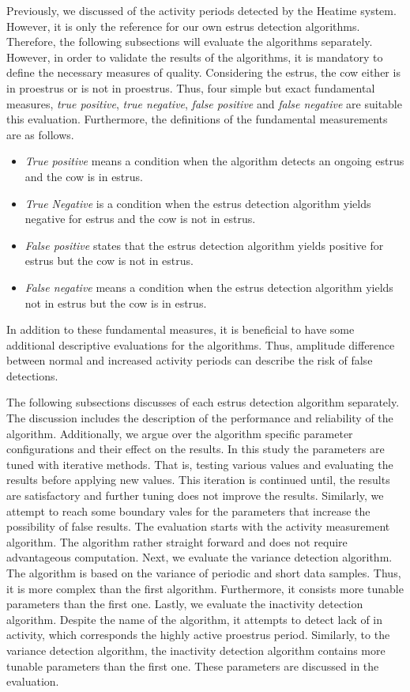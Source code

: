 \documentclass[english,12pt,a4paper,pdftex,elec,utf8]{aaltothesis}
\begin{document}
Previously, we discussed of the activity periods detected by the Heatime system. However, it is only the reference for our own estrus detection algorithms. Therefore, the following subsections will evaluate the algorithms separately. However, in order to validate the results of the algorithms, it is mandatory to define the necessary measures of quality. Considering the estrus, the cow either is in proestrus or is not in proestrus. Thus, four simple but exact fundamental measures, \textit{true positive}, \textit{true negative}, \textit{false positive} and \textit{false negative} are suitable this evaluation. Furthermore, the definitions of the fundamental measurements are as follows.

\begin{itemize}
\item \textit{True positive} means a condition when the algorithm detects an ongoing estrus and the cow is in estrus.
\item \textit{True Negative} is a condition when the estrus detection algorithm yields negative for estrus and the cow is not in estrus.
\item \textit{False positive} states that the estrus detection algorithm yields positive for estrus but the cow is not in estrus.
\item \textit{False negative} means a condition when the estrus detection algorithm yields not in estrus but the cow is in estrus.
\end{itemize}
In addition to these fundamental measures, it is beneficial to have some additional descriptive evaluations for the algorithms. Thus, amplitude difference between normal and increased activity periods can describe the risk of false detections. 


The following subsections discusses of each estrus detection algorithm separately. The discussion includes the description of the performance and reliability of the algorithm. Additionally, we argue over the algorithm specific parameter configurations and their effect on the results. In this study the parameters are tuned with iterative methods. That is, testing various values and evaluating the results before applying new values. This iteration is continued until, the results are satisfactory and further tuning does not improve the results. Similarly, we attempt to reach some boundary vales for the parameters that increase the possibility of false results. The evaluation starts with the activity measurement algorithm. The algorithm rather straight forward and does not require advantageous computation. Next, we  evaluate the variance detection algorithm. The algorithm is based on the variance of periodic and short data samples. Thus, it is more complex than the first algorithm. Furthermore, it consists more tunable parameters than the first one. Lastly, we evaluate the inactivity detection algorithm. Despite the name of the algorithm, it attempts to detect lack of in activity, which corresponds the highly active proestrus period. Similarly, to the variance detection algorithm, the inactivity detection algorithm contains more tunable parameters than the first one. These parameters are discussed in the evaluation.
\end{document}
